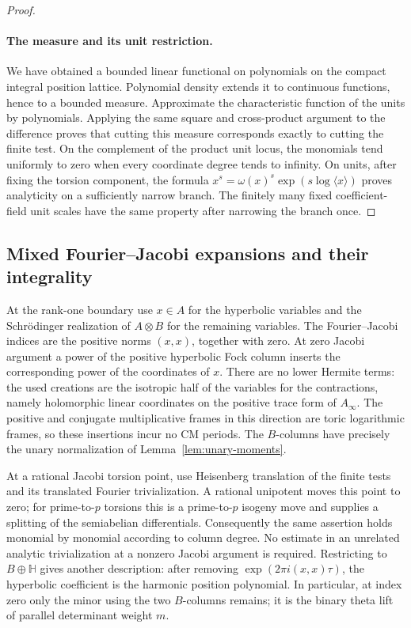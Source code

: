\begin{proof}
 \paragraph{The measure and its unit restriction.}
 We have obtained a bounded linear functional on polynomials on the
 compact integral position lattice.  Polynomial density extends it to
 continuous functions, hence to a bounded measure.  Approximate the
 characteristic function of the units by polynomials.  Applying the
 same square and cross-product argument to the difference proves that
 cutting this measure corresponds exactly to cutting the finite test.
 On the complement of the product unit locus, the monomials tend
 uniformly to zero when every coordinate degree tends to infinity.
 On units, after fixing the torsion component, the formula
 $x^s=\omega(x)^s\exp(s\log\langle x\rangle)$ proves analyticity on a
 sufficiently narrow branch.  The finitely many fixed coefficient-field
 unit scales have the same property after narrowing the branch once.
\end{proof}

\subsection{Mixed Fourier--Jacobi expansions and their integrality}

At the rank-one boundary use $x\in A$ for the hyperbolic variables and
the Schr\"odinger realization of $A\otimes B$ for the remaining variables.
The Fourier--Jacobi indices are the positive norms $(x,x)$, together
with zero.  At zero Jacobi argument a power of the positive hyperbolic
Fock column inserts the corresponding power of the coordinates of $x$.
There are no lower Hermite terms: the used creations are the isotropic
half of the variables for the contractions, namely holomorphic linear
coordinates on the positive trace form of $A_\infty$.
The positive and conjugate multiplicative frames in this direction are
toric logarithmic frames, so these insertions incur no CM periods.
The $B$-columns have precisely the unary normalization of
Lemma~\ref{lem:unary-moments}.

At a rational Jacobi torsion point, use Heisenberg translation of the
finite tests and its translated Fourier trivialization.  A rational
unipotent moves this point to zero; for prime-to-$p$ torsions this is a
prime-to-$p$ isogeny move and supplies a splitting of the semiabelian
differentials.  Consequently the same assertion holds monomial by
monomial according to column degree.  No estimate in an unrelated
analytic trivialization at a nonzero Jacobi argument is required.
Restricting to $B\oplus\mathbb H$ gives another description: after
removing $\exp(2\pi i(x,x)\tau)$, the hyperbolic coefficient is the
harmonic position polynomial.  In particular, at index zero only the
minor using the two $B$-columns remains; it is the binary theta lift of
parallel determinant weight $m$.

